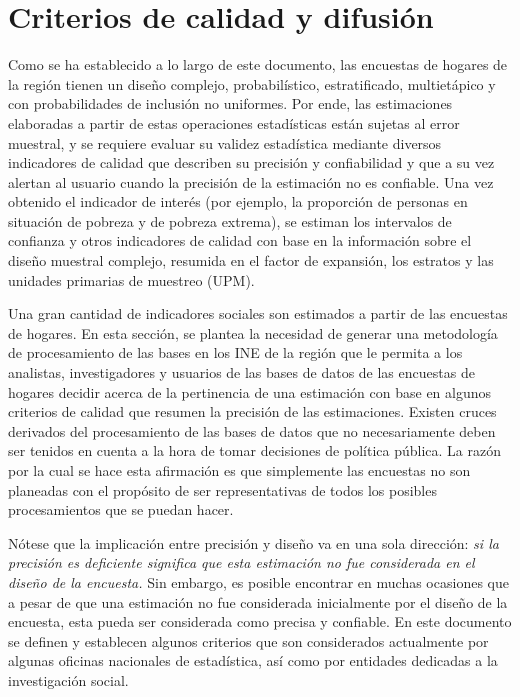 \documentclass[
  12pt,
]{book}
\begin{document}
\hypertarget{criterios-de-calidad-y-difusiuxf3n}{%
\chapter{Criterios de calidad y difusión}\label{criterios-de-calidad-y-difusiuxf3n}}

Como se ha establecido a lo largo de este documento, las encuestas de hogares de la región tienen un diseño complejo, probabilístico, estratificado, multietápico y con probabilidades de inclusión no uniformes. Por ende, las estimaciones elaboradas a partir de estas operaciones estadísticas están sujetas al error muestral, y se requiere evaluar su validez estadística mediante diversos indicadores de calidad que describen su precisión y confiabilidad y que a su vez alertan al usuario cuando la precisión de la estimación no es confiable. Una vez obtenido el indicador de interés (por ejemplo, la proporción de personas en situación de pobreza y de pobreza extrema), se estiman los intervalos de confianza y otros indicadores de calidad con base en la información sobre el diseño muestral complejo, resumida en el factor de expansión, los estratos y las unidades primarias de muestreo (UPM).

Una gran cantidad de indicadores sociales son estimados a partir de las encuestas de hogares. En esta sección, se plantea la necesidad de generar una metodología de procesamiento de las bases en los INE de la región que le permita a los analistas, investigadores y usuarios de las bases de datos de las encuestas de hogares decidir acerca de la pertinencia de una estimación con base en algunos criterios de calidad que resumen la precisión de las estimaciones. Existen cruces derivados del procesamiento de las bases de datos que no necesariamente deben ser tenidos en cuenta a la hora de tomar decisiones de política pública. La razón por la cual se hace esta afirmación es que simplemente las encuestas no son planeadas con el propósito de ser representativas de todos los posibles procesamientos que se puedan hacer.

Nótese que la implicación entre precisión y diseño va en una sola dirección: \emph{si la precisión es deficiente significa que esta estimación no fue considerada en el diseño de la encuesta.} Sin embargo, es posible encontrar en muchas ocasiones que a pesar de que una estimación no fue considerada inicialmente por el diseño de la encuesta, esta pueda ser considerada como precisa y confiable. En este documento se definen y establecen algunos criterios que son considerados actualmente por algunas oficinas nacionales de estadística, así como por entidades dedicadas a la investigación social.
\end{document}
